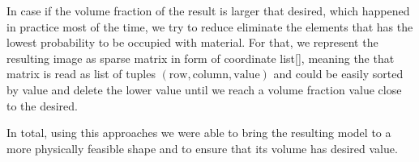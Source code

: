 In case if the volume fraction of the result is larger that desired, which happened in practice most of the time, we try to reduce eliminate the elements that has the lowest probability to be occupied with material.
For that, we represent the resulting image as sparse matrix in form of coordinate list\ref{}, meaning the that matrix is read as list of tuples $(\mathrm{row},\mathrm{column},\mathrm{value})$ and could be easily sorted by value and delete the lower value until we reach a volume fraction value close to the desired.

In total, using this approaches we were able to bring the resulting model to a more physically feasible shape and to ensure that its volume has desired value.



 